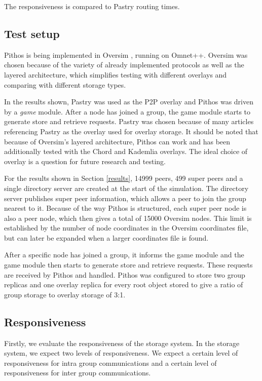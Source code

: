 \documentclass[10pt,a4paper,conference]{IEEEtran}
\begin{document}
The responsiveness is compared to Pastry routing times.

\subsection{Test setup}

Pithos is being implemented in Oversim \cite{OverSim_2007}, running on Omnet++. Oversim was chosen because of the variety of already implemented
protocols as well as the layered architecture, which simplifies testing with different overlays and comparing with different storage types.

In the results shown, Pastry was used as the P2P overlay and Pithos was driven by a \emph{game} module. After a node has joined a group, the game
module starts to generate store and retrieve requests. Pastry was chosen because of many articles referencing Pastry as the overlay used for overlay
storage. It should be noted that because of Oversim's layered architecture, Pithos can work and has been additionally tested with the Chord and
Kademlia overlays. The ideal choice of overlay is a question for future research and testing.

For the results shown in Section \ref{results}, 14999 peers, 499 super peers and a single directory server are created at the start of the
simulation. The directory server publishes super peer information, which allows a peer to join the group nearest to it. Because of the way Pithos is
structured, each super peer node is also a peer node, which then gives a total of 15000 Oversim nodes. This limit is established by the number of
node coordinates in the Oversim coordinates file, but can later be expanded when a larger coordinates file is found.

After a specific node has joined a group, it informs the game module and the game module then starts to generate store and retrieve requests. These
requests are received by Pithos and handled. Pithos was configured to store two group replicas and one overlay replica for every root object stored
to give a ratio of group storage to overlay storage of 3:1.

\subsection{Responsiveness}
\label{responsiveness_results}

Firstly, we evaluate the responsiveness of the storage system. In the storage system, we expect two levels of responsiveness. We expect a certain
level of responsiveness for intra group communications and a certain level of responsiveness for inter group communications.
\end{document}
